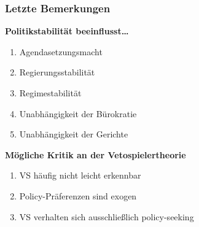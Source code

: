 \documentclass{beamer}
\begin{document}
\begin{frame}
\frametitle{Letzte Bemerkungen}
\textbf{Politikstabilität beeinflusst\dots}
\begin{enumerate}
  \item Agendasetzungsmacht
  \item Regierungsstabilität
  \item Regimestabilität
  \item Unabhängigkeit der Bürokratie
  \item Unabhängigkeit der Gerichte
\end{enumerate}

\textbf{Mögliche Kritik an der Vetospielertheorie}
\begin{enumerate}
  \item VS häufig nicht leicht erkennbar
  \item Policy-Präferenzen sind exogen
  \item VS verhalten sich ausschließlich policy-seeking
\end{enumerate}
\end{frame}
\end{document}
